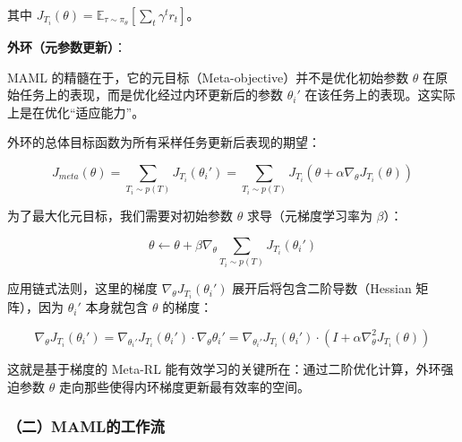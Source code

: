 其中 \(J_{T_i}(\theta) = \mathbb{E}_{\tau \sim \pi_\theta}\left[\sum_t \gamma^t r_t\right]\)。

\textbf{外环（元参数更新）}：

MAML 的精髓在于，它的元目标（Meta-objective）并不是优化初始参数 \(\theta\) 在原始任务上的表现，而是优化经过内环更新后的参数 \(\theta_i'\) 在该任务上的表现。这实际上是在优化``适应能力''。

外环的总体目标函数为所有采样任务更新后表现的期望：

\[
J_{meta}(\theta)
= \sum_{T_i \sim p(T)} J_{T_i}(\theta_i')
= \sum_{T_i \sim p(T)} J_{T_i}\left(\theta + \alpha \nabla_\theta J_{T_i}(\theta)\right)
\]

为了最大化元目标，我们需要对初始参数 \(\theta\) 求导（元梯度学习率为 \(\beta\)）：

\[
\theta \leftarrow \theta + \beta \nabla_\theta \sum_{T_i \sim p(T)} J_{T_i}(\theta_i')
\]

应用链式法则，这里的梯度 \(\nabla_\theta J_{T_i}(\theta_i')\) 展开后将包含二阶导数（Hessian 矩阵），因为 \(\theta_i'\) 本身就包含 \(\theta\) 的梯度：

\[
\nabla_\theta J_{T_i}(\theta_i')
= \nabla_{\theta_i'} J_{T_i}(\theta_i') \cdot \nabla_\theta \theta_i'
= \nabla_{\theta_i'} J_{T_i}(\theta_i') \cdot
\left(I + \alpha \nabla_\theta^2 J_{T_i}(\theta)\right)
\]

这就是基于梯度的 Meta-RL 能有效学习的关键所在：通过二阶优化计算，外环强迫参数 \(\theta\) 走向那些使得内环梯度更新最有效率的空间。

\hypertarget{ux4e8cmamlux7684ux5de5ux4f5cux6d41}{%
\subsubsection{（二）MAML的工作流}\label{ux4e8cmamlux7684ux5de5ux4f5cux6d41}}

